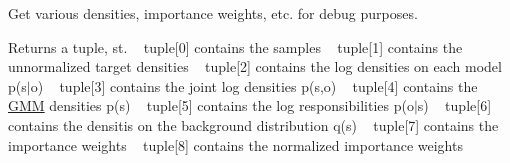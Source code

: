 Get various densities, importance weights, etc. for debug purposes. \begin{DoxyReturn}{Returns}
a tuple, st. ~\newline
 tuple\mbox{[}0\mbox{]} contains the samples ~\newline
 tuple\mbox{[}1\mbox{]} contains the unnormalized target densities ~\newline
 tuple\mbox{[}2\mbox{]} contains the log densities on each model p(s$\vert$o) ~\newline
 tuple\mbox{[}3\mbox{]} contains the joint log densities p(s,o) ~\newline
 tuple\mbox{[}4\mbox{]} contains the \hyperlink{classGMM}{G\+MM} densities p(s) ~\newline
 tuple\mbox{[}5\mbox{]} contains the log responsibilities p(o$\vert$s) ~\newline
 tuple\mbox{[}6\mbox{]} contains the densitis on the background distribution q(s) ~\newline
 tuple\mbox{[}7\mbox{]} contains the importance weights ~\newline
 tuple\mbox{[}8\mbox{]} contains the normalized importance weights 
\end{DoxyReturn}

